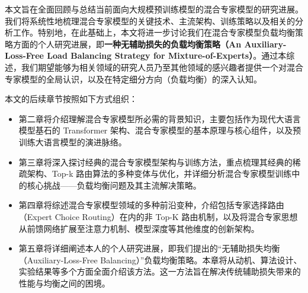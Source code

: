 本文旨在全面回顾与总结当前面向大规模预训练模型的混合专家模型的研究进展。我们将系统性地梳理混合专家模型的关键技术、主流架构、训练策略以及相关的分析工作。特别地，在此基础上，本文将进一步讨论我们在混合专家模型负载均衡策略方面的个人研究进展，即\textbf{一种无辅助损失的负载均衡策略（An Auxiliary-Loss-Free Load Balancing Strategy for Mixture-of-Experts）}\cite{Wang2024AuxiliaryLossFreeLB}。通过本综述，我们期望能够为相关领域的研究人员乃至其他领域的感兴趣者提供一个对混合专家模型的全局认识，以及在特定细分方向（负载均衡）的深入认知。



本文的后续章节按照如下方式组织：
\begin{itemize}
    \item 第二章将介绍理解混合专家模型所必需的背景知识，主要包括作为现代大语言模型基石的 Transformer 架构、混合专家模型的基本原理与核心组件，以及预训练大语言模型的演进脉络。
    \item 第三章将深入探讨经典的混合专家模型架构与训练方法，重点梳理其经典的稀疏架构、Top-k 路由算法的多种变体与优化，并详细分析混合专家模型训练中的核心挑战——负载均衡问题及其主流解决策略。
    \item 第四章将综述混合专家模型领域的多种前沿变种，介绍包括专家选择路由（Expert Choice Routing）在内的非 Top-K 路由机制，以及将混合专家思想从前馈网络扩展至注意力机制、模型深度等其他维度的创新架构。
    \item 第五章将详细阐述本人的个人研究进展，即我们提出的“无辅助损失均衡（Auxiliary-Loss-Free Balancing）”负载均衡策略。本章将从动机、算法设计、实验结果等多个方面全面介绍该方法。这一方法旨在解决传统辅助损失带来的性能与均衡之间的困境。
\end{itemize}
